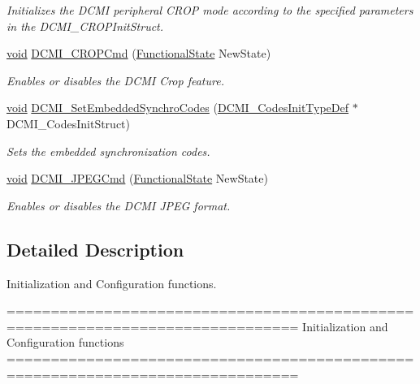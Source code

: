 \begin{DoxyCompactItemize}
\begin{DoxyCompactList}\small\item\em Initializes the D\-C\-M\-I peripheral C\-R\-O\-P mode according to the specified parameters in the D\-C\-M\-I\-\_\-\-C\-R\-O\-P\-Init\-Struct. \end{DoxyCompactList}\item 
\hyperlink{group___n_a_m_e_ga18028b8badbf1ea7e704ccac3c488e82}{void} \hyperlink{group___d_c_m_i___group1_ga7139eecdc0f7975b42cd2f9c5644d0a5}{D\-C\-M\-I\-\_\-\-C\-R\-O\-P\-Cmd} (\hyperlink{group___exported__types_gac9a7e9a35d2513ec15c3b537aaa4fba1}{Functional\-State} New\-State)
\begin{DoxyCompactList}\small\item\em Enables or disables the D\-C\-M\-I Crop feature. \end{DoxyCompactList}\item 
\hyperlink{group___n_a_m_e_ga18028b8badbf1ea7e704ccac3c488e82}{void} \hyperlink{group___d_c_m_i___group1_ga8888b27bd5aca62d250642468ea6cd6d}{D\-C\-M\-I\-\_\-\-Set\-Embedded\-Synchro\-Codes} (\hyperlink{struct_d_c_m_i___codes_init_type_def}{D\-C\-M\-I\-\_\-\-Codes\-Init\-Type\-Def} $\ast$D\-C\-M\-I\-\_\-\-Codes\-Init\-Struct)
\begin{DoxyCompactList}\small\item\em Sets the embedded synchronization codes. \end{DoxyCompactList}\item 
\hyperlink{group___n_a_m_e_ga18028b8badbf1ea7e704ccac3c488e82}{void} \hyperlink{group___d_c_m_i___group1_ga30a38a4858273c05e8f1b4677d744c13}{D\-C\-M\-I\-\_\-\-J\-P\-E\-G\-Cmd} (\hyperlink{group___exported__types_gac9a7e9a35d2513ec15c3b537aaa4fba1}{Functional\-State} New\-State)
\begin{DoxyCompactList}\small\item\em Enables or disables the D\-C\-M\-I J\-P\-E\-G format. \end{DoxyCompactList}\end{DoxyCompactItemize}


\subsection{Detailed Description}
Initialization and Configuration functions. \begin{DoxyVerb} ===============================================================================
                  Initialization and Configuration functions
 ===============================================================================  \end{DoxyVerb}
 

